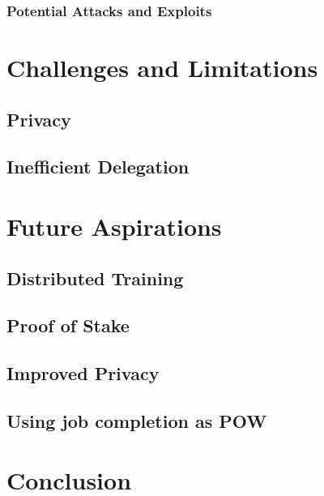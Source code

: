 \documentclass{article}
\begin{document}
\subsubsection{Potential Attacks and Exploits}

\section{Challenges and Limitations}
\subsection{Privacy}
\subsection{Inefficient Delegation}

\section {Future Aspirations}
\subsection{Distributed Training}
\subsection{Proof of Stake}
\subsection{Improved Privacy}    
\subsection{Using job completion as POW}

\section {Conclusion}
\end{document}
